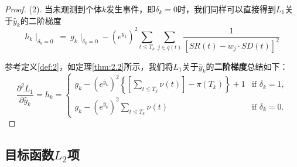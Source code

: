 \begin{proof}
(2). 当未观测到个体$k$发生事件，即$\delta_k=0$时，我们同样可以直接得到$L_1$关于$\hat{y}_k$的二阶梯度$$
h_k\mid_{\delta_k=0}\ =\ g_k\mid_{\delta_k=0} - (e^{\hat{y}_k})^2 \sum_{t\le T_k} \sum_{j\in q(t)} \frac{1}{[SR(t) - w_j\cdot SD(t)]^2}
$$

参考定义\ref{def:2}，如定理\ref{thm:2.2}所示，我们将$L_1$关于$\hat{y}_k$的\textbf{二阶梯度}总结如下：$$
\frac{\partial^2 L_1}{\partial \hat{y}_k} = h_k = 
\begin{cases}
g_k - (e^{\hat{y}_k})^2 \left\{ \left[\sum_{t\le T_k} \nu(t)\right] - \pi(T_k) \right\} + 1 & \text{if } \delta_k = 1,\\
g_k - (e^{\hat{y}_k})^2 \sum_{t\le T_k} \nu(t) & \text{if } \delta_k = 0.
\end{cases}
$$
\end{proof}

\subsection{目标函数$L_2$项}

